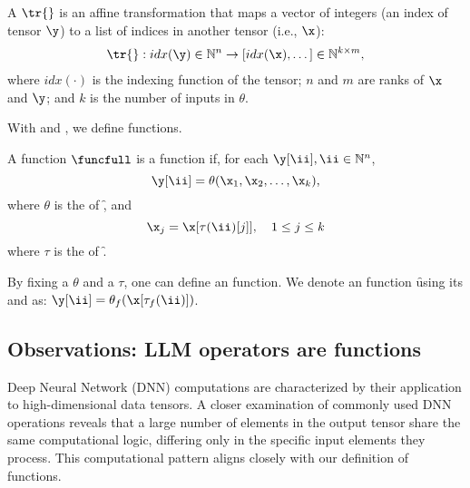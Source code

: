 \begin{definition}[\Depmap]
A \depmap $\tr{}$ is an affine transformation that maps
    a vector of integers (an index of tensor $\y$)
    to a list of indices in another tensor (i.e., $\x$):
\begin{align*}
    \tr{}: idx(\y) \in \mathbb{N}^n \to [idx(\x), \dots] \in \mathbb{N}^{k \times m},
\end{align*}
where $idx(\cdot)$ is the indexing function of the tensor; $n$ and $m$ are ranks of $\x$ and $\y$;
and $k$ is the number of inputs in $\theta$.
\label{def:mapping}
\label{def:depmap}
\end{definition}


With \depmap and \kfunc, we define \simd{} functions.


\begin{definition}
\label{def:simd_func}

A function
$\funcfull$
is a \simd{} function if,
for each $\y[\ii], \ii \in \mathbb{N}^n$,
\[
\y[\ii] = \theta(\x_{1}, \x_{2}, \dots, \x_{k}),
\]
where $\theta$ is the \kfunc of \f, and
\[
\x_{j} = \x[ \tau(\ii)[j] ],\quad 1\le j \le k
\]
where $\tau$ is the \depmap of \f.
\label{def:simdfunc}
\end{definition}


By fixing a \kfunc $\theta$ and a \depmap $\tau$,
one can define an \simd{} function.
We denote an \simd{} function \f using its \kfunc and \depmap as:
$\y[\ii] = \theta_f(\x[\tau_f(\ii)])$.





\subsection{Observations: LLM operators are \simd{} functions}

Deep Neural Network (DNN) computations are characterized by their application
to high-dimensional data tensors. A closer examination of commonly used DNN
operations reveals that a large number of elements in the output tensor share
the same computational logic, differing only in the specific input elements
they process.
This computational pattern aligns closely with our definition of \simd{} functions.


